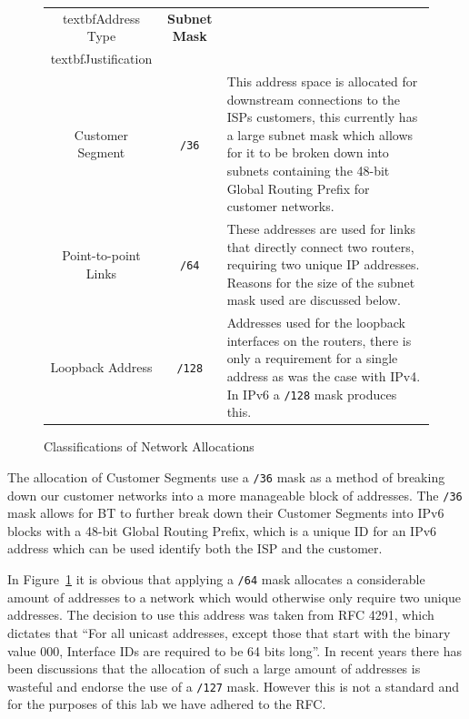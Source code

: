 \begin{figure}[!ht]     \caption{Classifications of Network Allocations}
\label{figure:network-alloc-3}     \centering
\begin{tabular}{|c|c|p{5.5cm}|}
		
		\hline textbf{Address Type} & \textbf{Subnet Mask} &
		\\textbf{Justification} \\
		
        \hline         Customer Segment & \texttt{/36} & This address space is
allocated for downstream connections to the ISPs customers, this currently has a
large subnet mask which allows for it to be broken down into subnets containing
the 48-bit Global Routing Prefix for customer networks.\\
		
        \hline         Point-to-point Links & \texttt{/64} & These addresses are
used for links that directly connect two routers, requiring two unique IP
addresses. Reasons for the size of the subnet mask used are discussed below.\\
		
        \hline         Loopback Address & \texttt{/128} & Addresses used for the
loopback         interfaces on the routers, there is only a requirement for a
single         address as was the case with IPv4. In IPv6 a \texttt{/128} mask
produces this.\\
		
		\hline     \end{tabular} \end{figure}

The allocation of Customer Segments use a \texttt{/36} mask as a method of
breaking down our customer networks into a more manageable block of addresses.
The \texttt{/36} mask allows for BT to further break down their Customer
Segments into IPv6 blocks with a 48-bit Global Routing Prefix, which is a unique
ID for an IPv6 address which can be used identify both the ISP and the customer.

In Figure~\ref{figure:network-alloc-3} it is obvious that applying a
\texttt{/64} mask allocates a considerable amount of addresses to a network
which would otherwise only require two unique addresses. The decision to use
this address was taken from RFC 4291, which dictates that ``For all unicast
addresses, except those that start with the binary value 000, Interface IDs are
required to be 64 bits long''. In recent years there has been discussions that
the allocation of such a large amount of addresses is wasteful and endorse the
use of a \texttt{/127} mask. However this is not a standard and for the purposes
of this lab we have adhered to the RFC.
